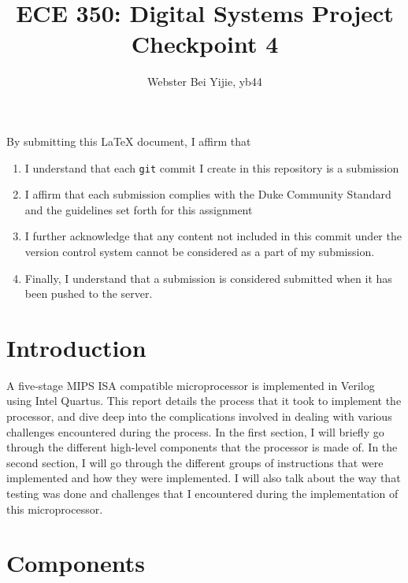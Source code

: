\documentclass{article}
\title{ECE 350: Digital Systems Project Checkpoint 4}
\author{Webster Bei Yijie, yb44}
\begin{document}
	\maketitle
	By submitting this \LaTeX{} document, I affirm that
\begin{enumerate}
    \item I understand that each \texttt{git} commit I create in this repository is a submission
    \item I affirm that each submission complies with the Duke Community Standard and the guidelines set forth for this assignment
    \item I further acknowledge that any content not included in this commit under the version control system cannot be considered as a part of my submission.
    \item Finally, I understand that a submission is considered submitted when it has been pushed to the server.
\end{enumerate}
\tableofcontents
\newpage
	\section{Introduction}
	A five-stage MIPS ISA compatible microprocessor is implemented in Verilog using Intel Quartus. This report details the process that it took to implement the processor, and dive deep into the complications involved in dealing with various challenges encountered during the process. In the first section, I will briefly go through the different high-level components that the processor is made of. In the second section, I will go through the different groups of instructions that were implemented and how they were implemented. I will also talk about the way that testing was done and challenges that I encountered during the implementation of this microprocessor.  
	\section{Components}
\end{document}
